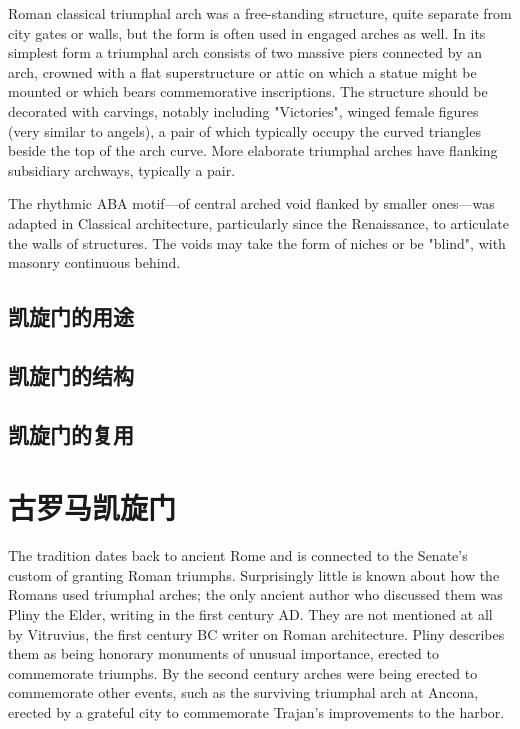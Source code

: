 \documentclass[a4paper,dvipdfm]{article}
\begin{document}
Roman classical triumphal arch was a free-standing structure, quite
separate from city gates or walls, but the form is often used in
engaged arches as well. In its simplest form a triumphal arch consists
of two massive piers connected by an arch, crowned with a flat
superstructure or attic on which a statue might be mounted or which
bears commemorative inscriptions. The structure should be decorated
with carvings, notably including "Victories", winged female figures
(very similar to angels), a pair of which typically occupy the curved
triangles beside the top of the arch curve. More elaborate triumphal
arches have flanking subsidiary archways, typically a pair.

The rhythmic ABA motif—of central arched void flanked by smaller
ones—was adapted in Classical architecture, particularly since the
Renaissance, to articulate the walls of structures. The voids may take
the form of niches or be "blind", with masonry continuous behind.



\subsection{凯旋门的用途}

\subsection{凯旋门的结构}

\subsection{凯旋门的复用}

\section{古罗马凯旋门}

The tradition dates back to ancient Rome and is connected to the
Senate's custom of granting Roman triumphs. Surprisingly little is
known about how the Romans used triumphal arches; the only ancient
author who discussed them was Pliny the Elder, writing in the first
century AD. They are not mentioned at all by Vitruvius, the first
century BC writer on Roman architecture. Pliny describes them as being
honorary monuments of unusual importance, erected to commemorate
triumphs. By the second century arches were being erected to
commemorate other events, such as the surviving triumphal arch at
Ancona, erected by a grateful city to commemorate Trajan's
improvements to the harbor.
\end{document}
